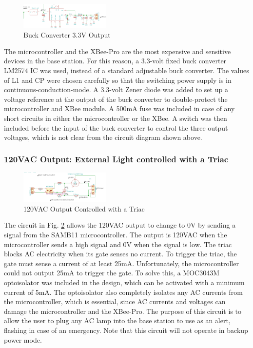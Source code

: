 \documentclass[journal,compsoc]{IEEEtran}
\begin{document}
\begin{figure}[ht]	%
\centering
\includegraphics[width=0.4\textwidth]{Buck.png}
\caption{ Buck Converter 3.3V Output }
\label{PConverter}
\end{figure}

The microcontroller and the XBee-Pro are the most expensive and sensitive devices in the base station. For this reason, a 3.3-volt fixed buck converter LM2574 IC was used, instead of a standard adjustable buck converter.  The values of L1 and CP were chosen carefully so that the switching power supply is in continuous-conduction-mode.  A 3.3-volt Zener diode was added to set up a voltage reference at the output of the buck converter to double-protect the microcontroller and XBee module.  A 500mA fuse was included in case of any short circuits in either the microcontroller or the XBee.  A switch was then included before the input of the buck converter to control the three output voltages, which is not clear from the circuit diagram shown above.

\subsubsection{120VAC Output: External Light controlled with a Triac}

\begin{figure}[ht]	%
\centering
\includegraphics[width=0.4\textwidth]{Triac.png}
\caption{ 120VAC Output Controlled with a Triac}
\label{PTriac}
\end{figure}

The circuit in Fig. \ref{PTriac} allows the 120VAC output to change to 0V by sending a signal from the SAMB11 microcontroller.  The output is 120VAC when the microcontroller sends a high signal and 0V when the signal is low.  The triac blocks AC electricity when its gate senses no current.  To trigger the triac, the gate must sense a current of at least 25mA.  Unfortunately, the microcontroller could not output 25mA to trigger the gate.  To solve this, a MOC3043M optoisolator was included in the design, which can be activated with a minimum current of 5mA.  The optoisolator also completely isolates any AC currents from the microcontroller, which is essential, since AC currents and voltages can damage the microcontroller and the XBee-Pro.  The purpose of this circuit is to allow the user to plug any AC lamp into the base station to use as an alert, flashing in case of an emergency.  Note that this circuit will not operate in backup power mode.
\end{document}
